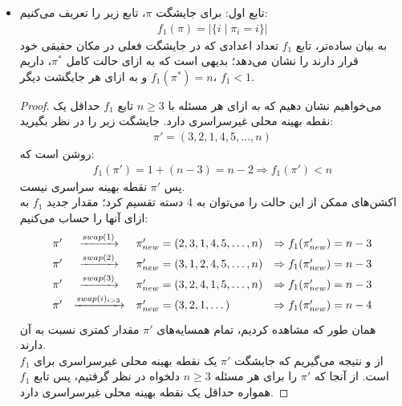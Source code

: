 \begin{ابجد}
\item
\begin{itemize}
    \item تابع اول: برای جایشگت $\pi$، تابع  زیر را تعریف می‌کنیم:
          \begin{align*}
              f_1(\pi) = \left| \{ i \mid \pi_i = i \} \right|
          \end{align*}
          به بیان ساده‌تر، تابع $f_1$ تعداد اعدادی که در جایشگت فعلی در مکان حقیقی خود قرار دارند را نشان می‌دهد؛ بدیهی است که به ازای حالت کامل $\pi^*$، داریم $f_1(\pi^*)=n$ و به ازای هر جایگشت دیگر، $f_1<1$.
          \begin{proof}
              می‌خواهیم نشان دهیم که به ازای هر مسئله با $n \geq 3$ تابع $f_1$ حداقل یک نقطه بهینه محلی غیرسراسری دارد. جایشگت زیر را در نظر بگیرید:
              \begin{align*}
                  \pi' = (3, 2, 1, 4, 5, \dots, n)
              \end{align*}
              روشن است که:
              \begin{align*}
                  f_1(\pi') = 1 + (n-3) = n-2 \Rightarrow f_ 1(\pi') < n
              \end{align*}
              پس $\pi'$ نقطه بهینه سراسری نیست.  \\
              اکشن‌های ممکن از این حالت را می‌توان به 4 دسته تقسیم کرد؛ مقدار جدید $f_1$ به ازای آنها را حساب می‌کنیم:
              \[
                  \renewcommand{\arraystretch}{1.5} %
                  \begin{array}{c c l l}
                      \pi' & \xrightarrow{swap(1)}         & \pi'_{new} = (2, 3, 1, 4, 5, \dots, n) & \Rightarrow f_1(\pi'_{new}) = n - 3 \\
                      \pi' & \xrightarrow{swap(2)}         & \pi'_{new} = (3, 1, 2, 4, 5, \dots, n) & \Rightarrow f_1(\pi'_{new}) = n - 3 \\
                      \pi' & \xrightarrow{swap(3)}         & \pi'_{new} = (3, 2, 4, 1, 5, \dots, n) & \Rightarrow f_1(\pi'_{new}) = n - 3 \\
                      \pi' & \xrightarrow{swap(i)_{i > 3}} & \pi'_{new} = (3, 2, 1, \dots)          & \Rightarrow f_1(\pi'_{new}) = n - 4
                  \end{array}
              \]
              همان طور که مشاهده کردیم، تمام همسایه‌های $\pi'$ مقدار  کمتری نسبت به آن دارند.  \\
              از  و  نتیجه می‌گیریم که جایشگت $\pi'$ یک نقطه بهینه محلی غیرسراسری برای $f_1$ است. از آنجا که $\pi'$ را برای هر مسئله $n \geq 3$ دلخواه در نظر گرفتیم، پس تابع $f_1$ همواره حداقل یک نقطه بهینه محلی غیرسراسری دارد.
          \end{proof}


\end{itemize}
\end{ابجد}

